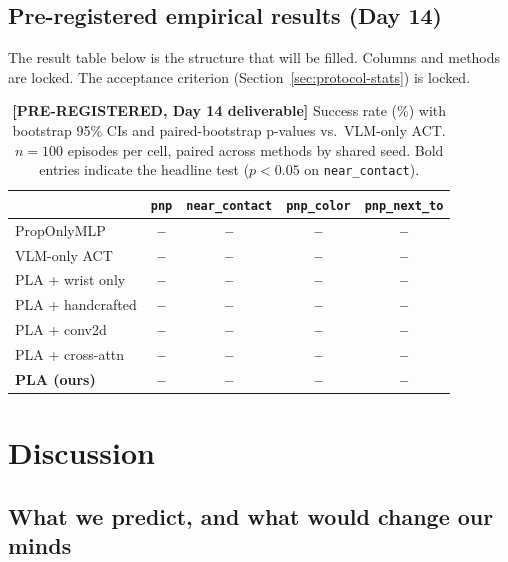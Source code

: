 \documentclass[11pt]{article}
\newcommand{\pending}[1]{\textcolor{orange!80!black}{\textbf{#1}}}
\begin{document}
\subsection{Pre-registered empirical results (Day 14)}

The result table below is the structure that will be filled. Columns
and methods are locked. The acceptance criterion
(Section~\ref{sec:protocol-stats}) is locked.

\begin{table}[t]
\centering
\caption{\pending{[PRE-REGISTERED, Day 14 deliverable]} Success rate (\%)
with bootstrap 95\% CIs and paired-bootstrap p-values vs.\ VLM-only ACT.
$n = 100$ episodes per cell, paired across methods by shared seed. Bold
entries indicate the headline test ($p < 0.05$ on \texttt{near\_contact}).}
\label{tab:results}
\small
\begin{tabular}{lcccc}
\toprule
& \texttt{pnp} & \texttt{near\_contact} & \texttt{pnp\_color} & \texttt{pnp\_next\_to} \\
\midrule
PropOnlyMLP    & \pending{--} & \pending{--} & \pending{--} & \pending{--} \\
VLM-only ACT   & \pending{--} & \pending{--} & \pending{--} & \pending{--} \\
\midrule
PLA + wrist only       & \pending{--} & \pending{--} & \pending{--} & \pending{--} \\
PLA + handcrafted      & \pending{--} & \pending{--} & \pending{--} & \pending{--} \\
PLA + conv2d           & \pending{--} & \pending{--} & \pending{--} & \pending{--} \\
PLA + cross-attn       & \pending{--} & \pending{--} & \pending{--} & \pending{--} \\
\midrule
\textbf{PLA (ours)}    & \pending{--} & \pending{--} & \pending{--} & \pending{--} \\
\bottomrule
\end{tabular}
\end{table}

\section{Discussion}
\label{sec:discussion}

\subsection{What we predict, and what would change our minds}
\end{document}
